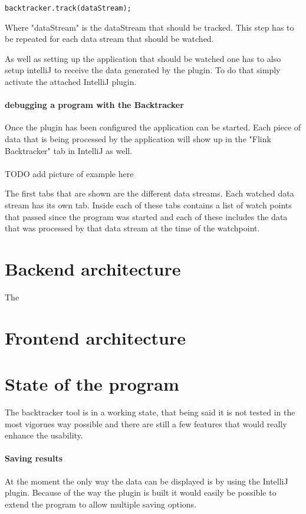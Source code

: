 \begin{lstlisting}
backtracker.track(dataStream);
\end{lstlisting}

Where "dataStream" is the dataStream that should be tracked. This step has to be repeated for each data stream that should be watched.

As well as setting up the application that should be watched one has to also setup intelliJ to receive the data generated by  the plugin. To do that simply activate the attached IntelliJ plugin.

\paragraph{debugging a program with the Backtracker}

Once the plugin has been configured the application can be started. Each piece of data that is being processed by the application will show up in the "Flink Backtracker" tab in IntelliJ as well.

\paragraph{} TODO add picture of example here

The first tabs that are shown are the different data streams. Each watched data stream has its own tab. Inside each of these tabs contains a list of watch points that passed since the program was started and each of these includes the data that was processed by that data stream at the time of the watchpoint.

\section{Backend architecture}
\label{fbBackend}
The

\section{Frontend architecture}
\label{fbFrontend}


\section{State of the program}
\label{fbState}
The backtracker tool is in a working state, that being said it is not tested in the most vigorues way possible and there are still a few features that would really enhance the usability.

\paragraph{Saving results}
At the moment the only way the data can be displayed is by using the IntelliJ plugin. Because of the way the plugin is built it would easily be possible to extend the program to allow multiple saving options.
